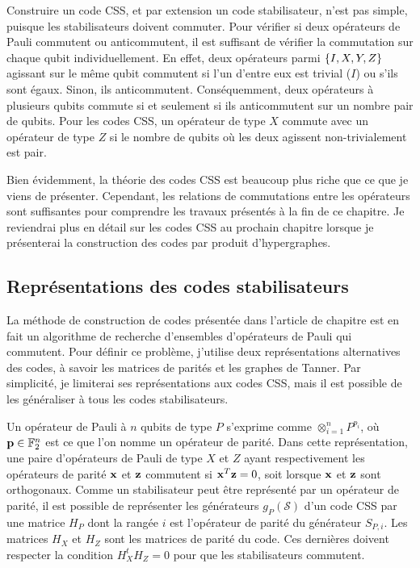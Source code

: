 Construire un code CSS, et par extension un code stabilisateur, n'est pas simple,
puisque les stabilisateurs doivent commuter.
Pour vérifier si deux opérateurs de Pauli commutent ou anticommutent,
il est suffisant de vérifier la commutation sur chaque qubit individuellement.
En effet,
deux opérateurs parmi $\qty{I, X, Y, Z}$ agissant sur le même qubit commutent si l'un d'entre 
eux est trivial ($I$) ou s'ils sont égaux.
Sinon, ils anticommutent.
Conséquemment,
deux opérateurs à plusieurs qubits commute si et seulement si ils anticommutent sur un nombre 
pair de qubits.
Pour les codes CSS, 
un opérateur de type $X$ commute avec un opérateur de type $Z$ si le nombre de qubits où les deux
agissent non-trivialement est pair.

Bien évidemment,
la théorie des codes CSS est beaucoup plus riche que ce que je viens de présenter.
Cependant,
les relations de commutations entre les opérateurs sont suffisantes pour comprendre
les travaux présentés à la fin de ce chapitre.
Je reviendrai plus en détail sur les codes CSS au prochain chapitre lorsque je présenterai
la construction des codes par produit d'hypergraphes.
 
\subsection{Représentations des codes stabilisateurs}
\label{sec:representations_codes}

La méthode de construction de codes présentée dans l'article de chapitre est en fait un algorithme
de recherche d'ensembles d'opérateurs de Pauli qui commutent.
Pour définir ce problème,
j'utilise deux représentations alternatives des codes, à savoir les matrices de parités et les graphes de Tanner.
Par simplicité,
je limiterai ses représentations aux codes CSS,
mais il est possible de les généraliser à tous les codes stabilisateurs.

Un opérateur de Pauli à $n$ qubits de type $P$ s'exprime comme $\otimes_{i=1}^{n} P^{p_i}$,
où $\vb p \in \mathbb{F}_{2}^{n}$ est ce que l'on nomme un opérateur de parité.
Dans cette représentation,
une paire d'opérateurs de Pauli de type $X$ et $Z$ ayant respectivement les opérateurs de parité $\vb x$ 
et $\vb z$ commutent si $\vb x^T \vb z = 0$,
soit lorsque $\vb x$ et $\vb z$ sont orthogonaux.
Comme un stabilisateur peut être représenté par un opérateur de parité,
il est possible de représenter les générateurs $g_P(\mathcal S)$ d'un code CSS
par une matrice $H_P$ dont la rangée $i$ est l'opérateur de parité du
générateur $S_{P, i}$.
Les matrices $H_X$ et $H_Z$ sont les matrices de parité du code.
Ces dernières doivent respecter la condition $H_X^t H_Z = 0$ pour 
que les stabilisateurs commutent.

